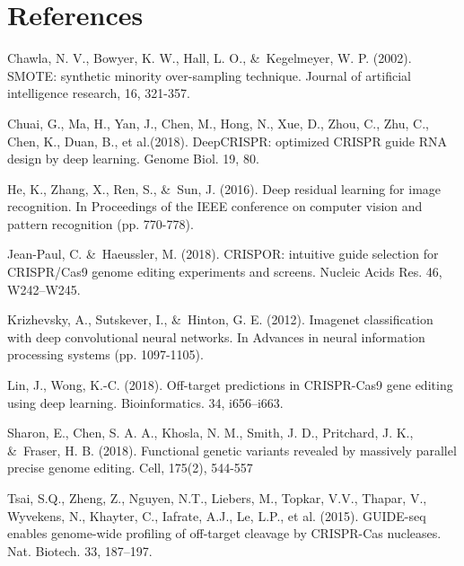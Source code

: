\documentclass[10pt,twocolumn,letterpaper]{article}
\begin{document}
	
\section*{References}	

Chawla, N. V., Bowyer, K. W., Hall, L. O., \&\ Kegelmeyer, W. P. (2002). SMOTE: synthetic minority over-sampling technique. Journal of artificial intelligence research, 16, 321-357.

Chuai, G., Ma, H., Yan, J., Chen, M., Hong, N., Xue, D., Zhou, C., Zhu, C., Chen, K., Duan, B., et al.(2018). DeepCRISPR: optimized CRISPR guide RNA design by deep learning. Genome Biol. 19, 80.

He, K., Zhang, X., Ren, S., \&\ Sun, J. (2016). Deep residual learning for image recognition. In Proceedings of the IEEE conference on computer vision and pattern recognition (pp. 770-778).

Jean-Paul, C. \&\ Haeussler, M. (2018). CRISPOR: intuitive guide selection for CRISPR/Cas9 genome editing experiments and screens. Nucleic Acids Res. 46, W242–W245.

Krizhevsky, A., Sutskever, I., \&\ Hinton, G. E. (2012). Imagenet classification with deep convolutional neural networks. In Advances in neural information processing systems (pp. 1097-1105).

Lin, J., Wong, K.-C. (2018). Off-target predictions in CRISPR-Cas9 gene editing using deep learning. Bioinformatics. 34, i656–i663.

Sharon, E., Chen, S. A. A., Khosla, N. M., Smith, J. D., Pritchard, J. K., \&\ Fraser, H. B. (2018). Functional genetic variants revealed by massively parallel precise genome editing. Cell, 175(2), 544-557

Tsai, S.Q., Zheng, Z., Nguyen, N.T., Liebers, M., Topkar, V.V., Thapar, V., Wyvekens, N., Khayter, C., Iafrate, A.J., Le, L.P., et al. (2015). GUIDE-seq enables genome-wide profiling of off-target cleavage by CRISPR-Cas nucleases. Nat. Biotech. 33, 187–197.
\end{document}

